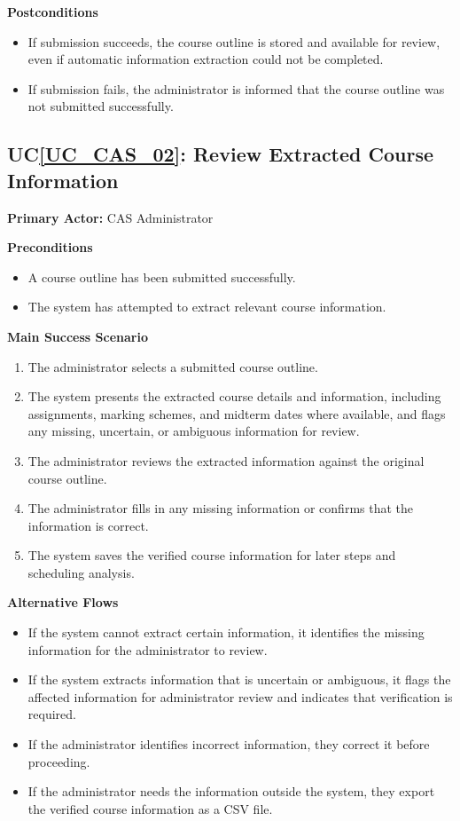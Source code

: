 \documentclass[12pt]{article}
\newcounter{ucnum} %
\newcommand{\ucref}[1]{UC\ref{#1}}
\begin{document}
\noindent \textbf{Postconditions}
\begin{itemize}
  \item If submission succeeds, the course outline is stored and available for review, even if automatic information extraction could not be completed.
  \item If submission fails, the administrator is informed that the course outline was not submitted successfully.
\end{itemize}



 \label{UC_CAS_02}
\subsection{\ucref{UC_CAS_02}: Review Extracted Course Information}

\noindent \textbf{Primary Actor:} CAS Administrator

\noindent \textbf{Preconditions}
\begin{itemize}
  \item A course outline has been submitted successfully.
  \item The system has attempted to extract relevant course information.
\end{itemize}

\noindent \textbf{Main Success Scenario}
\begin{enumerate}
  \item The administrator selects a submitted course outline.
  \item The system presents the extracted course details and information, including assignments, marking schemes, and midterm dates where available, and flags any missing, uncertain, or ambiguous information for review.
  \item The administrator reviews the extracted information against the original course outline.
  \item The administrator fills in any missing information or confirms that the information is correct.
  \item The system saves the verified course information for later steps and scheduling analysis.
\end{enumerate}

\noindent \textbf{Alternative Flows}
\begin{itemize}
  \item If the system cannot extract certain information, it identifies the missing information for the administrator to review.
  \item If the system extracts information that is uncertain or ambiguous, it flags the affected information for administrator review and indicates that verification is required.
  \item If the administrator identifies incorrect information, they correct it before proceeding.
  \item If the administrator needs the information outside the system, they export the verified course information as a CSV file.
\end{itemize}
\end{document}
